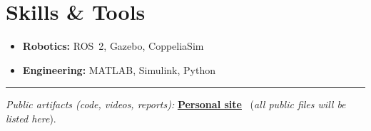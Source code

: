 \documentclass[a4paper,10pt]{article}
\begin{document}
\section{Skills \& Tools}
\begin{multicols}{2}
\begin{itemize}[leftmargin=*]
  \item \textbf{Robotics:} ROS~2, Gazebo, CoppeliaSim
  \item \textbf{Engineering:} MATLAB, Simulink, Python
\end{itemize}
\end{multicols}

\vspace{2pt}\hrule\vspace{2pt}
\small \textit{Public artifacts (code, videos, reports):} \href{https://msunbulee.github.io/portfolio/}{\textbf{Personal site}} \ (\textit{all public files will be listed here}).
\end{document}
